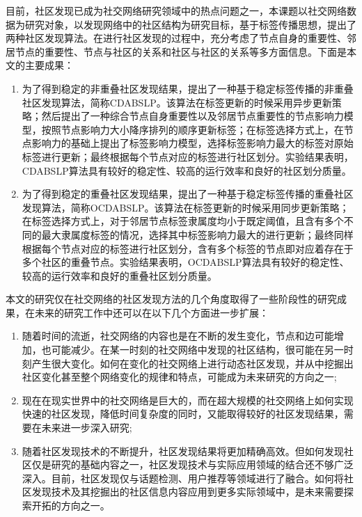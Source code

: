 \begin{conclusion}
目前，社区发现已成为社交网络研究领域中的热点问题之一，本课题以社交网络数据为研究对象，以发现网络中的社区结构为研究目标，基于标签传播思想，提出了两种社区发现算法。在进行社区发现的过程中，充分考虑了节点自身的重要性、邻居节点的重要性、节点与社区的关系和社区与社区的关系等多方面信息。下面是本文的主要成果：
\begin{enumerate}
    \item 为了得到稳定的非重叠社区发现结果，提出了一种基于稳定标签传播的非重叠社区发现算法，简称CDABSLP。该算法在标签更新的时候采用异步更新策略；然后提出了一种综合节点自身重要性以及邻居节点重要性的节点影响力模型，按照节点影响力大小降序排列的顺序更新标签；在标签选择方式上，在节点影响力的基础上提出了标签影响力模型，选择标签影响力最大的标签对原始标签进行更新；最终根据每个节点对应的标签进行社区划分。实验结果表明，CDABSLP算法具有较好的稳定性、较高的运行效率和良好的社区划分质量。
    \item 为了得到稳定的重叠社区发现结果，提出了一种基于稳定标签传播的重叠社区发现算法，简称OCDABSLP。该算法在标签更新的时候采用同步更新策略；在标签选择方式上，对于邻居节点标签隶属度均小于既定阈值，且含有多个不同的最大隶属度标签的情况，选择其中标签影响力最大的进行更新；最终同样根据每个节点对应的标签进行社区划分，含有多个标签的节点即对应着存在于多个社区的重叠节点。实验结果表明，OCDABSLP算法具有较好的稳定性、较高的运行效率和良好的重叠社区划分质量。
\end{enumerate}

本文的研究仅在社交网络的社区发现方法的几个角度取得了一些阶段性的研究成果，在未来的研究工作中还可以在以下几个方面进一步扩展：

\begin{enumerate}
    \item 随着时间的流逝，社交网络的内容也是在不断的发生变化，节点和边可能增加，也可能减少。在某一时刻的社交网络中发现的社区结构，很可能在另一时刻产生很大变化。如何在变化的社交网络上进行动态社区发现，并从中挖掘出社区变化甚至整个网络变化的规律和特点，可能成为未来研究的方向之一;
    \item 现在在现实世界中的社交网络是巨大的，而在超大规模的社交网络上如何实现快速的社区发现，降低时间复杂度的同时，又能取得较好的社区发现结果，需要在未来进一步深入研究;
    \item 随着社区发现技术的不断提升，社区发现结果将更加精确高效。但如何发现社区仅是研究的基础内容之一，社区发现技术与实际应用领域的结合还不够广泛深入。目前，社区发现仅与话题检测、用户推荐等领域进行了融合。如何将社区发现技术及其挖掘出的社区信息内容应用到更多实际领域中，是未来需要探索开拓的方向之一。
\end{enumerate}

\end{conclusion}